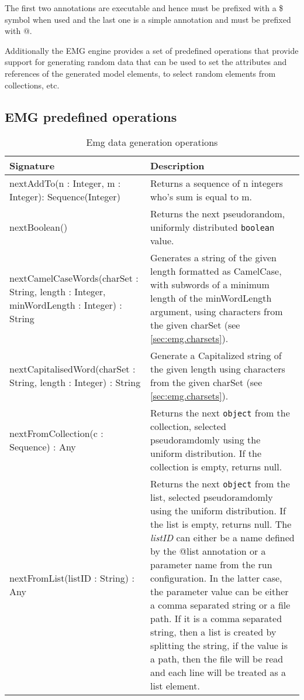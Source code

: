 The first two annotations are executable and hence must be prefixed with a \$ symbol when used and the last one is a simple annotation and must be prefixed with @.

Additionally the EMG engine provides a set of predefined operations that provide support for generating random data that can be used to set the attributes and references of the generated model elements, to select random elements from collections, etc.

\subsection{EMG predefined  operations}
\begin{longtabu} {|p{6.5cm}|X|}
	\caption{Emg data generation operations}
	\label{tab:EmgOperations}\\
	\hline
	\textbf{Signature} & \textbf{Description} \\\hline
	
	nextAddTo(n : Integer, m : Integer): Sequence(Integer)  & Returns a sequence of n integers who's sum is equal to m. \\\hline
    
    nextBoolean()	 & Returns the next pseudorandom, uniformly distributed \texttt{boolean} value.\\\hline
    
	nextCamelCaseWords(charSet : String, length : Integer, minWordLength : Integer) : String & Generates a string of the given length formatted as CamelCase, with subwords of a minimum length of the minWordLength argument, using characters from the given charSet (see \ref{sec:emg.charsets}).\\\hline
	
	nextCapitalisedWord(charSet : String, length : Integer) : String & Generate a Capitalized string of the given length using characters from the given charSet (see \ref{sec:emg.charsets}).\\\hline
	
	nextFromCollection(c : Sequence) : Any & Returns the next \texttt{object} from the collection, selected pseudoramdomly using the uniform distribution. If the collection is empty, returns null.\\\hline
	
	nextFromList(listID : String) : Any & Returns the next \texttt{object} from the list, selected pseudoramdomly using the uniform distribution. If the list is empty, returns null. The \emph{listID} can either be a name defined by the @list annotation or a parameter name from the run configuration.  In the latter case, the parameter value can be either a comma separated string or a file path. If it is a comma separated string, then a list is created by splitting the string, if the value is a path, then the file will be read and each line will be treated as a list element. \\\hline
	

\end{longtabu}
